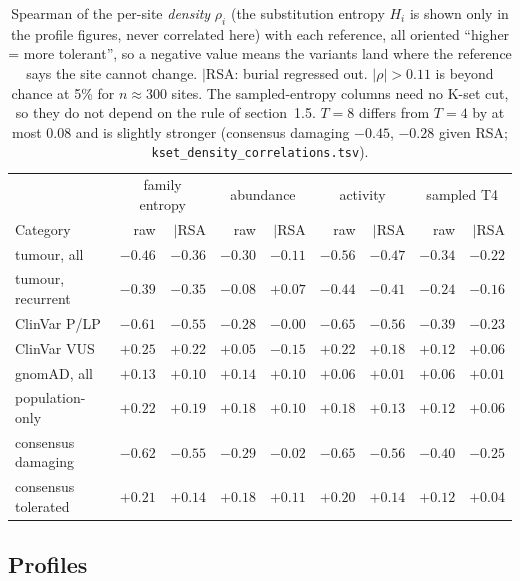 \documentclass[11pt,a4paper]{article}
\newcommand{\file}[1]{\texttt{#1}}
\begin{document}
\begin{table}[H]
\centering\small
\begin{tabular}{@{}lrrrrrrrr@{}}
\toprule
 & \multicolumn{2}{c}{family entropy} & \multicolumn{2}{c}{abundance} &
 \multicolumn{2}{c}{activity} & \multicolumn{2}{c}{sampled T4} \\
Category & raw & $|$RSA & raw & $|$RSA & raw & $|$RSA & raw & $|$RSA \\
\midrule
tumour, all & $-0.46$ & $-0.36$ & $-0.30$ & $-0.11$ & $-0.56$ & $-0.47$ & $-0.34$ & $-0.22$ \\
tumour, recurrent & $-0.39$ & $-0.35$ & $-0.08$ & $+0.07$ & $-0.44$ & $-0.41$ & $-0.24$ & $-0.16$ \\
ClinVar P/LP & $-0.61$ & $-0.55$ & $-0.28$ & $-0.00$ & $-0.65$ & $-0.56$ & $-0.39$ & $-0.23$ \\
ClinVar VUS & $+0.25$ & $+0.22$ & $+0.05$ & $-0.15$ & $+0.22$ & $+0.18$ & $+0.12$ & $+0.06$ \\
gnomAD, all & $+0.13$ & $+0.10$ & $+0.14$ & $+0.10$ & $+0.06$ & $+0.01$ & $+0.06$ & $+0.01$ \\
population-only & $+0.22$ & $+0.19$ & $+0.18$ & $+0.10$ & $+0.18$ & $+0.13$ & $+0.12$ & $+0.06$ \\
consensus damaging & $\mathbf{-0.62}$ & $-0.55$ & $-0.29$ & $\mathbf{-0.02}$ & $\mathbf{-0.65}$ & $-0.56$ & $-0.40$ & $-0.25$ \\
consensus tolerated & $+0.21$ & $+0.14$ & $+0.18$ & $+0.11$ & $+0.20$ & $+0.14$ & $+0.12$ & $+0.04$ \\
\bottomrule
\end{tabular}
\caption{Spearman of the per-site \emph{density} $\rho_i$ (the substitution
entropy $H_i$ is shown only in the profile figures, never correlated here)
with each reference, all oriented
``higher = more tolerant'', so a negative value means the variants land where
the reference says the site cannot change. $|$RSA: burial regressed out.
$|\rho|>0.11$ is beyond chance at 5\% for $n\approx 300$ sites. The
sampled-entropy columns need no K-set cut, so they do not depend on the rule of
section~1.5. $T=8$ differs from $T=4$ by at most 0.08 and is slightly stronger
(consensus damaging $-0.45$, $-0.28$ given RSA;
\file{kset\_density\_correlations.tsv}).}
\label{tab:corr}
\end{table}

\subsection{Profiles}
\end{document}
